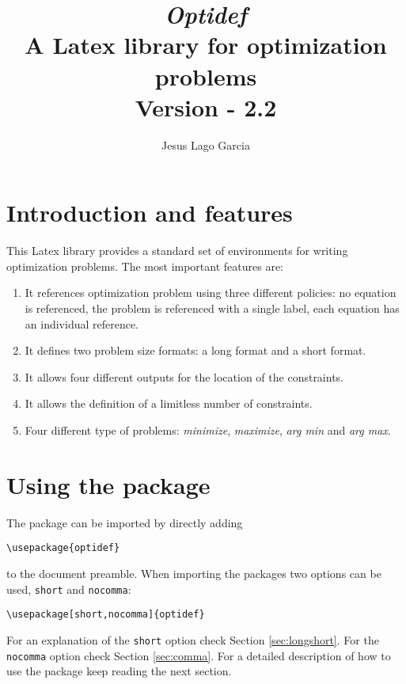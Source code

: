 \documentclass[a4paper]{article}
\title{\textit{\textbf{Optidef}} \\ A Latex library for optimization problems\\ \textnormal{Version - 2.2}}
\author{Jesus Lago Garcia}
\begin{document}
\maketitle

\newpage

\tableofcontents

\newpage

\section{Introduction and features}

This Latex library provides a standard set of environments for writing optimization problems. The most important features are:
\begin{enumerate}
\item It references optimization problem using three different policies: no equation is referenced, the problem is referenced with a single label, each equation has an individual reference.
\item It defines two problem size formats: a long format and a short format.
\item It allows four different outputs for the location of the constraints.
\item It allows the definition of a limitless number of constraints.
\item Four different type of problems: \textit{minimize}, \textit{maximize}, \textit{arg min} and \textit{arg max}.
\end{enumerate}

\section{Using the package}
The package can be imported by directly adding
\begin{lstlisting}
\usepackage{optidef}
\end{lstlisting}
to the document preamble. When importing the packages two options can be used, \verb|short| and \verb|nocomma|:

\begin{lstlisting}
\usepackage[short,nocomma]{optidef}
\end{lstlisting}

For an explanation of the \verb|short| option check Section \ref{sec:longshort}. For the \verb|nocomma| option check Section \ref{sec:comma}. For a detailed description of how to use the package keep reading the next section.
\end{document}

